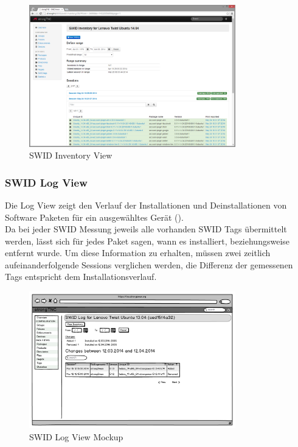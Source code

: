 \begin{figure}[H]
	\centering
	\includegraphics[width=0.8\textwidth]{./images/Views/inventory-view}
	\caption{SWID Inventory View}
	\label{fig:swid-inventory-view}
\end{figure}


\subsubsection{SWID Log View}
Die Log View zeigt den Verlauf der Installationen und Deinstallationen von Software Paketen für ein ausgewähltes Gerät ().\\
Da bei jeder SWID Messung jeweils alle vorhanden SWID Tags übermittelt werden,
lässt sich für jedes Paket sagen, wann es installiert, beziehungsweise entfernt
wurde. Um diese Information zu erhalten, müssen zwei zeitlich
aufeinanderfolgende Sessions verglichen werden, die Differenz der gemessenen Tags entspricht dem Installationsverlauf.

\begin{figure}[H]
	\centering
	\includegraphics[width=0.8\textwidth]{./images/mockups/swid-log}
	\caption{SWID Log View Mockup}
	\label{fig:swid-log}
\end{figure}

